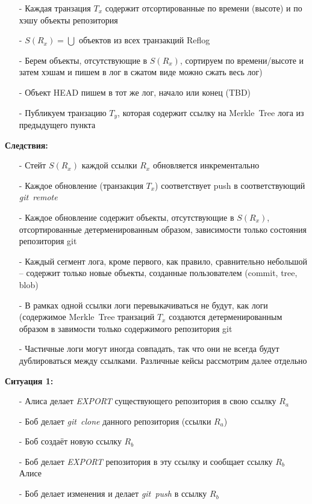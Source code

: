\documentclass[11pt,a4paper]{article}
\begin{document}
\begin{itemize}
  \item[-] Каждая транзация $T_x$ содержит
           отсортированные по времени (высоте) и по хэшу объекты репозитория
  \item[-] $S(R_x) = \bigcup$ объектов из всех транзакций Reflog
  \item[-] Берем объекты, отсутствующие в $S(R_x)$, сортируем по времени/высоте и затем хэшам
           и пишем в лог в сжатом виде можно сжать весь лог)
  \item[-] Объект HEAD пишем в тот же лог, начало или конец (TBD)
  \item[-] Публикуем транзацию $T_y$, которая содержит ссылку на Merkle~Tree лога из предыдущего
           пункта
\end{itemize}

\textbf{Следствия:}

\begin{itemize}
  \item[-] Стейт $S(R_x)$ каждой ссылки $R_x$ обновляется инкрементально
  \item[-] Каждое обновление (транзакция $T_x$) соответствует push в соответствующий
           \textit{git~remote}
  \item[-] Каждое обновление содержит объекты, отсутствующие в $S(R_x)$, отсортированные
           детерменированным образом, зависимости только состояния репозитория git
  \item[-] Каждый сегмент лога, кроме первого, как правило, сравнительно небольшой -- содержит
           только новые объекты, созданные пользователем (commit, tree, blob)
  \item[-] В рамках одной ссылки логи перевыкачиваться не будут, как логи (содержимое
           Merkle~Tree транзаций $T_x$ создаются детерменированным образом в завимости только
           содержимого репозитория git
  \item[-] Частичные логи могут иногда совпадать, так что они не всегда будут дублироваться между
           ссылками. Различные кейсы рассмотрим далее отдельно
\end{itemize}

\textbf{Ситуация 1:}

\begin{itemize}
  \item[-] Алиса делает \textit{EXPORT} существующего репозитория в свою ссылку $R_a$
  \item[-] Боб делает \textit{git~clone} данного репозитория (ссылки $R_a$)
  \item[-] Боб создаёт новую ссылку $R_b$
  \item[-] Боб делает \textit{EXPORT} репозитория в эту ссылку
           и сообщает ссылку $R_b$ Алисе
  \item[-] Боб делает изменения и делает \textit{git~push} в ссылку $R_b$
\end{itemize}
\end{document}
